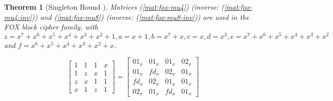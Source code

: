 \documentclass{report}
\newtheorem{theorem}{Theorem}{\bfseries}{\itshape}
\begin{document}
\begin{theorem}[Singleton Bound \cite{SloaneBook}]

Matrices (\ref{mat:fox-mu4}) (inverse: (\ref{mat:fox-mu4-inv})) and (\ref{mat:fox-mu8}) (inverse: (\ref{mat:fox-mu8-inv})) are used in the FOX block cipher family, with $z = x^7+x^6+x^5+x^4+x^3+x^2+1, a = x+1, b = x^7+x, c = x, d = x^2, e = x^7+x^6+x^5+x^4+x^3+x^2$ and $f = x^6+x^5+x^4+x^3+x^2+x$.

\begin{equation}\label{mat:fox-mu4}
\begin{bmatrix}
1 & 1 & 1 & x\\
1 & z & x & 1\\
z & x & 1 & 1\\
x & 1 & z & 1
\end{bmatrix}
=
\begin{bmatrix}
01_x & 01_x & 01_x & 02_x\\
01_x & fd_x & 02_x & 01_x\\
fd_x & 02_x & 01_x & 01_x\\
02_x & 01_x & fd_x & 01_x
\end{bmatrix}
\end{equation}


\end{theorem}
\end{document}
